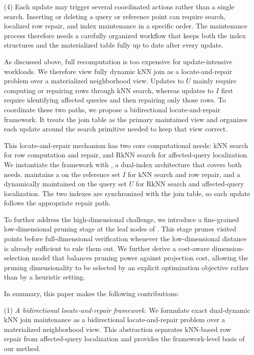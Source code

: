 \noindent(4) Each update may trigger several coordinated actions rather than a single search. Inserting or deleting a query or reference point can require search, localized row repair, and index maintenance in a specific order. The maintenance process therefore needs a carefully organized workflow that keeps both the index structures and the materialized table fully up to date after every update.

As discussed above, full recomputation is too expensive for update-intensive workloads. We therefore view fully dynamic kNN join as a locate-and-repair problem over a materialized neighborhood view. Updates to $U$ mainly require computing or repairing rows through kNN search, whereas updates to $I$ first require identifying affected queries and then repairing only those rows. To coordinate these two paths, we propose a bidirectional locate-and-repair framework. It treats the join table as the primary maintained view and organizes each update around the search primitive needed to keep that view correct.

This locate-and-repair mechanism has two core computational needs: kNN search for row computation and repair, and RkNN search for affected-query localization. We instantiate the framework with \dualtree, a dual-index architecture that covers both needs. \dualtree maintains a \deltatree on the reference set $I$ for kNN search and row repair, and a dynamically maintained \hdrtree on the query set $U$ for RkNN search and affected-query localization. The two indexes are synchronized with the join table, so each update follows the appropriate repair path.

To further address the high-dimensional challenge, we introduce a fine-grained low-dimensional pruning stage at the leaf nodes of \dualtree. This stage prunes visited points before full-dimensional verification whenever the low-dimensional distance is already sufficient to rule them out. We further derive a cost-aware dimension-selection model that balances pruning power against projection cost, allowing the pruning dimensionality to be selected by an explicit optimization objective rather than by a heuristic setting.

In summary, this paper makes the following contributions:

\noindent(1) \emph{A bidirectional locate-and-repair framework.}
We formulate exact dual-dynamic kNN join maintenance as a bidirectional locate-and-repair problem over a materialized neighborhood view. This abstraction separates kNN-based row repair from affected-query localization and provides the framework-level basis of our method.

